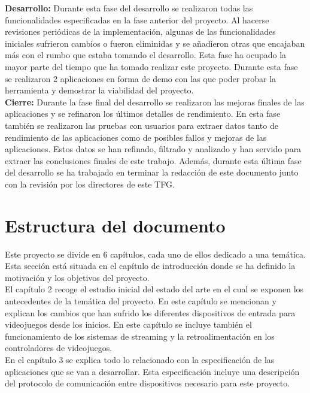 \textbf{Desarrollo:} Durante esta fase del desarrollo se realizaron todas las funcionalidades especificadas en la fase anterior del proyecto. Al hacerse revisiones peri\'odicas de la implementaci\'on, algunas de las funcionalidades iniciales sufrieron cambios o fueron eliminidas y se a\~nadieron otras que encajaban m\'as con el rumbo que estaba tomando el desarrollo. 
Esta fase ha ocupado la mayor parte del tiempo que ha tomado realizar este proyecto. Durante esta fase se realizaron 2 aplicaciones en forma de demo con las que poder probar la herramienta y demostrar la viabilidad del proyecto.\\

\textbf{Cierre:} Durante la fase final del desarrollo se realizaron las mejoras finales de las aplicaciones y se refinaron los \'ultimos detalles de rendimiento. En esta fase tambi\'en se realizaron las pruebas con usuarios para extraer datos tanto de rendimiento de las aplicaciones como de posibles fallos y mejoras de las aplicaciones. Estos datos se han refinado, filtrado y analizado y han servido para extraer las conclusiones finales de este trabajo. Adem\'as, durante esta \'ultima fase del desarrollo se ha trabajado en terminar la redacci\'on de este documento junto con la revisi\'on por los directores de este TFG. 

\section{Estructura del documento}

Este proyecto se divide en 6 cap\'itulos, cada uno de ellos dedicado a una tem\'atica. Esta secci\'on est\'a situada en el cap\'itulo de introducci\'on donde se ha definido la motivaci\'on y los objetivos del proyecto.\\

El cap\'itulo 2 recoge el estudio inicial del estado del arte en el cual se exponen los antecedentes de la tem\'atica del proyecto. En este cap\'itulo se mencionan y explican los cambios que han sufrido los diferentes dispositivos de entrada para videojuegos desde los inicios. En este cap\'itulo se incluye tambi\'en el funcionamiento de los sistemas de streaming y la retroalimentaci\'on en los controladores de videojuegos.\\

En el cap\'itulo 3 se explica todo lo relacionado con la especificaci\'on de las aplicaciones que se van a desarrollar. Esta especificaci\'on incluye una descripci\'on del protocolo de comunicaci\'on entre dispositivos necesario para este proyecto.\\

